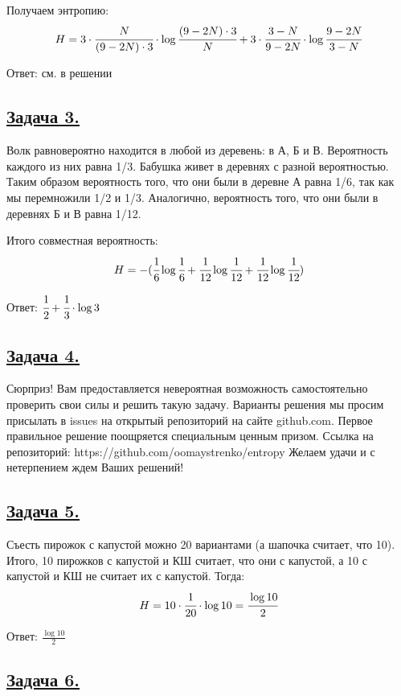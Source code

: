 Получаем энтропию:
\[H=3\cdot \cfrac{N}{(9-2N)\cdot3}\cdot \log \cfrac{(9-2N)\cdot3}{N}+3\cdot\cfrac{3-N}{9-2N}\cdot \log \cfrac{9-2N}{3-N}  \]

Ответ: см. в решении

\subsection*{\hyperref[sec:problem3]{Задача 3.}}\label{sec:sol_problem3}

Волк равновероятно находится в любой из деревень: в А, Б и В. Вероятность каждого из них равна 1/3. 
Бабушка живет в деревнях с разной вероятностью. Таким образом вероятность того, что они были в деревне А равна 1/6, так как мы перемножили 1/2 и 1/3. Аналогично, вероятность того, что они были в деревнях Б и В равна 1/12. 

Итого совместная вероятность:
\[H=-  (\cfrac{1}{6}\log \cfrac{1}{6} + \cfrac{1}{12}\log \cfrac{1}{12} + \cfrac{1}{12}\log \cfrac{1}{12} ) \] 

Ответ: $\cfrac{1}{2} + \cfrac{1}{3}\cdot\log3$

\subsection*{\hyperref[sec:problem4]{Задача 4.}}\label{sec:sol_problem4}

Сюрприз! Вам предоставляется невероятная возможность самостоятельно проверить свои силы и решить такую задачу. Варианты решения мы просим присылать в issues на открытый репозиторий на сайте github.com. Первое правильное решение поощряется специальным ценным призом. 
Ссылка на репозиторий:  https://github.com/oomaystrenko/entropy
Желаем удачи и с нетерпением ждем Ваших решений!

\subsection*{\hyperref[sec:problem5]{Задача 5.}}\label{sec:sol_problem5}
Съесть пирожок с капустой можно 20 вариантами (а шапочка считает, что 10).
Итого, 10 пирожков с капустой и КШ считает, что они с капустой, а 10 с капустой и КШ не считает их с капустой. 
Тогда:
\[H=10\cdot\cfrac{1}{20}\cdot\log10=\cfrac{\log10}{2}\]

Ответ: $\frac{\log10}{2}$

\subsection*{\hyperref[sec:problem6]{Задача 6.}}\label{sec:sol_problem6}

